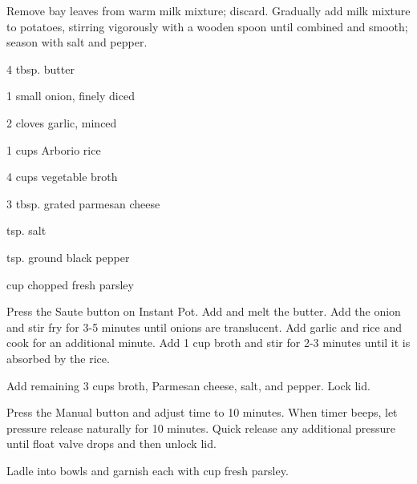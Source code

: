 \documentclass{cookbook}
\begin{document}
Remove bay leaves from warm milk mixture; discard. Gradually add milk mixture to potatoes, stirring vigorously with a wooden spoon until combined and smooth; season with salt and pepper.


\begin{ingredients}
    \item 4 tbsp. butter
    \item 1 small onion, finely diced
    \item 2 cloves garlic, minced
    \item 1  cups Arborio rice
    \item 4 cups vegetable broth
    \item 3 tbsp. grated parmesan cheese
    \item {} tsp. salt
    \item {} tsp. ground black pepper
    \item {} cup chopped fresh parsley   
\end{ingredients}

Press the Saute button on Instant Pot. Add and melt the butter. Add the onion and stir fry for 3-5 minutes until onions are translucent. Add garlic and rice and cook for an additional minute. Add 1 cup broth and stir for 2-3 minutes until it is absorbed by the rice.

Add remaining 3 cups broth, Parmesan cheese, salt, and pepper. Lock lid.

Press the Manual button and adjust time to 10 minutes. When timer beeps, let pressure release naturally for 10 minutes. Quick release any additional pressure until float valve drops and then unlock lid.

Ladle into bowls and garnish each with  cup fresh parsley.
\end{document}
